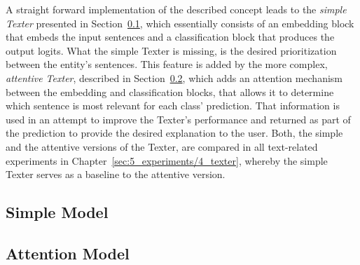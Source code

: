 A straight forward implementation of the described concept leads to the \emph{simple Texter} presented in Section~\ref{subsec:4_approach/1_texter/1_simple_model}, which essentially consists of an embedding block that embeds the input sentences and a classification block that produces the output logits. What the simple Texter is missing, is the desired prioritization between the entity's sentences. This feature is added by the more complex, \emph{attentive Texter}, described in Section~\ref{subsec:4_approach/1_texter/2_attention_model}, which adds an attention mechanism between the embedding and classification blocks, that allows it to determine which sentence is most relevant for each class' prediction. That information is used in an attempt to improve the Texter's performance and returned as part of the prediction to provide the desired explanation to the user. Both, the simple and the attentive versions of the Texter, are compared in all text-related experiments in Chapter~\ref{sec:5_experiments/4_texter}, whereby the simple Texter serves as a baseline to the attentive version.

\subsection{Simple Model}
\label{subsec:4_approach/1_texter/1_simple_model}


\subsection{Attention Model}
\label{subsec:4_approach/1_texter/2_attention_model}

